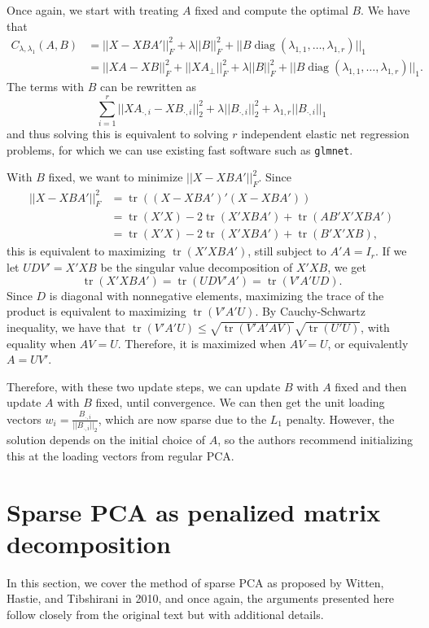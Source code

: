 \documentclass[11pt]{article}
\newcommand{\tr}{\operatorname*{tr}}
\newcommand{\diag}{\operatorname*{diag}}
\begin{document}
Once again, we start with treating $A$ fixed and compute the optimal $B$. We have that
\begin{align*}
C_{\lambda, \lambda_1}(A, B) &= ||X - XBA'||_F^2 + \lambda||B||_F^2 + ||B\diag(\lambda_{1, 1}, \dots, \lambda_{1, r})||_1 \\
&=  ||XA - XB||_F^2 + ||XA_{\bot}||_F^2 + \lambda||B||_F^2 + ||B\diag(\lambda_{1, 1}, \dots, \lambda_{1, r})||_1.
\end{align*}
The terms with $B$ can be rewritten as
$$
\sum_{i = 1}^r ||XA_{\cdot, i} - XB_{\cdot, i}||_2^2 + \lambda||B_{\cdot, i}||_2^2 + \lambda_{1,  r}||B_{\cdot, i}||_1
$$
and thus solving this is equivalent to solving $r$ independent elastic net regression problems, for which we can use existing fast software such as \texttt{glmnet}.

With $B$ fixed, we want to minimize $||X - XBA'||_F^2$. Since
\begin{align*}
||X - XBA'||_F^2 &= \tr((X - XBA')'(X - XBA')) \\
&= \tr(X'X) - 2\tr(X'XBA') + \tr(AB'X'XBA') \\
&= \tr(X'X) - 2\tr(X'XBA') + \tr(B'X'XB),
\end{align*}
this is equivalent to maximizing $\tr(X'XBA')$, still subject to $A'A = I_r$. If we let $UDV' = X'XB$ be the singular value decomposition of $X'XB$, we get 
$$
\tr(X'XBA') = \tr(UDV'A') = \tr(V'A'UD).
$$
Since $D$ is diagonal with nonnegative elements, maximizing the trace of the product is equivalent to maximizing $\tr(V'A'U)$. By Cauchy-Schwartz inequality, we have that $\tr(V'A'U) \leq \sqrt{\tr(V'A'AV)} \sqrt{\tr(U'U)}$, with equality when $AV = U$. Therefore, it is maximized when $AV = U$, or equivalently $A = UV'$.

Therefore, with these two update steps, we can update $B$ with $A$ fixed and then update $A$ with $B$ fixed, until convergence. We can then get the unit loading vectors $w_i = \frac{B_{\cdot, i}}{||B_{\cdot, i}||_2}$, which are now sparse due to the $L_1$ penalty. However, the solution depends on the initial choice of $A$, so the authors recommend initializing this at the loading vectors from regular PCA.

\section{Sparse PCA as penalized matrix decomposition}
In this section, we cover the method of sparse PCA as proposed by Witten, Hastie, and Tibshirani in 2010, and once again, the arguments presented here follow closely from the original text but with additional details. 
\end{document}
